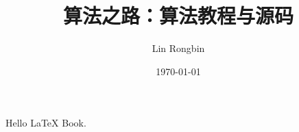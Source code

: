 \documentclass[cn]{wta}
\title{算法之路：算法教程与源码}
\author{Lin Rongbin}
\date{\today}
\begin{document}
\maketitle
Hello \LaTeX{} Book.
\end{document}

